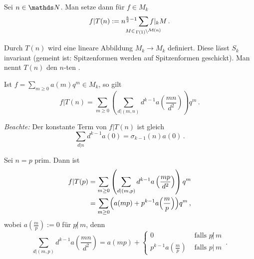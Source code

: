\begin{defi}
Sei $n \in \NN$. Man setze dann für $f \in M_k$
\[
f | T(n) := n^{\frac k2 - 1} \smashoperator{\sum_{M \in \linksmodulo{\Gamma(1)}{\mathcal M (n)}}} f |_k M
\,.
\]
\end{defi}

\begin{satz-list}\label{TnEndoMk}
\item Durch $T(n)$ wird eine lineare Abbildung $M_k \to M_k$ definiert. Diese lässt $S_k$ invariant (gemeint ist: Spitzenformen werden auf Spitzenformen geschickt). Man nennt $T(n)$ den $n$-ten .
\item Ist $f = \sum_{m \geq 0} a(m) q^m \in M_k$, so gilt
\[
f | T(n) = \sum_{m \geq 0} \left( \sum_{d | (m,n)} d^{k-1} a\left(\frac{mn}{d^2}\right) \right) q^m
\,.
\]

\emph{Beachte:} Der konstante Term von $f | T(n)$ ist gleich
\[
\sum_{d|n} d^{k-1} a(0) = \sigma_{k-1}(n) a(0)
\,.
\]
\end{satz-list}

\begin{bsp}
Sei $n = p$ prim. Dann ist
\begin{align*}
f | T(p) &= \sum_{m \geq 0} \left( \sum_{d | (m,p)} d^{k-1} a\left(\frac{mp}{d^2}\right) \right) q^m\\
&= \sum_{m \geq 0} \Bigl( a(mp) + p^{k-1} a\Bigl( \frac mp\Bigr) \Bigr) q^m
\,,
\end{align*}
wobei $a\left(\frac mp\right) := 0$ für $p \!\! \not | \, m$, denn
\[
\sum_{d | (m,p)} d^{k-1} a \left( \frac {mn}{d^2} \right) = a(mp) + 
\begin{cases}
0 & \text{ falls } p \!\! \not | \, m\\ 
p^{k-1} a \left(\frac mp \right) & \text{ falls } p | \, m
\end{cases}
\,.
\]
\end{bsp}

